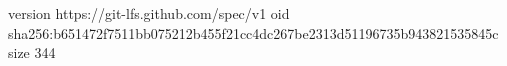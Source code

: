 version https://git-lfs.github.com/spec/v1
oid sha256:b651472f7511bb075212b455f21cc4dc267be2313d51196735b943821535845c
size 344
